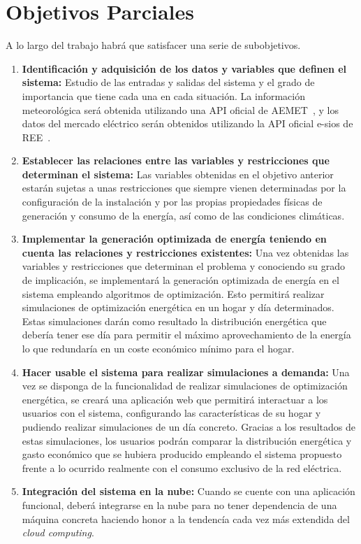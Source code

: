 \section{Objetivos Parciales}
A lo largo del trabajo habrá que satisfacer una serie de subobjetivos.
\begin{enumerate}
	\item \textbf{Identificación y adquisición de los datos y variables que definen el sistema:}
	Estudio de las entradas y salidas del sistema y el grado de importancia que tiene cada una en cada situación. La información meteorológica será obtenida utilizando una \gls{API} oficial de \gls{AEMET}~\cite{Aemet}, y los datos del mercado eléctrico serán obtenidos utilizando la \gls{API} oficial e-sios de \gls{REE}~\cite{Ree}.

	\item \textbf{Establecer las relaciones entre las variables y restricciones que determinan el sistema:}
	Las variables obtenidas en el objetivo anterior estarán sujetas a unas restricciones que siempre vienen determinadas por la configuración de la instalación y por las propias propiedades físicas de generación y consumo de la energía, así como de las condiciones climáticas.

	\item \textbf{Implementar la generación optimizada de energía teniendo en cuenta las relaciones y restricciones existentes:}
	Una vez obtenidas las variables y restricciones que determinan el problema y conociendo su grado de implicación, se implementará la generación optimizada de energía en el sistema empleando algoritmos de optimización. Esto permitirá realizar simulaciones de optimización energética en un hogar y día determinados. Estas simulaciones darán como resultado la distribución energética que debería tener ese día para permitir el máximo aprovechamiento de la energía lo que redundaría en un coste económico mínimo para el hogar.

      \item \textbf{Hacer usable el sistema para realizar simulaciones a demanda:}
        Una vez se disponga de la funcionalidad de realizar simulaciones de optimización energética, se creará una aplicación web que permitirá interactuar a los usuarios con el sistema, configurando las características de su hogar y pudiendo realizar simulaciones de un día concreto. Gracias a los resultados de estas simulaciones, los usuarios podrán comparar la distribución energética y gasto económico que se hubiera producido empleando el sistema propuesto frente a lo ocurrido realmente con el consumo exclusivo de la red eléctrica.

      \item \textbf{Integración del sistema en la nube:}
        Cuando se cuente con una aplicación funcional, deberá integrarse en la nube para no tener dependencia de una máquina concreta haciendo honor a la tendencía cada vez más extendida del \textit{cloud computing}.

\end{enumerate}
